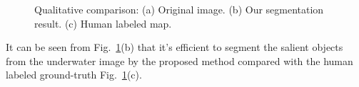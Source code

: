 \documentclass{article}
\begin{document}
\begin{figure}[h]
  \centering 
  \caption{Qualitative comparison: (a) Original image. (b) Our segmentation result. (c) Human labeled map.}
  \label{fig:comparison} %
\end{figure}

It can be seen from Fig.~\ref{fig:comparison}(b) that it's efficient to segment the salient objects from the underwater image by the proposed method compared with the human labeled ground-truth Fig.~\ref{fig:comparison}(c).





\end{document}
